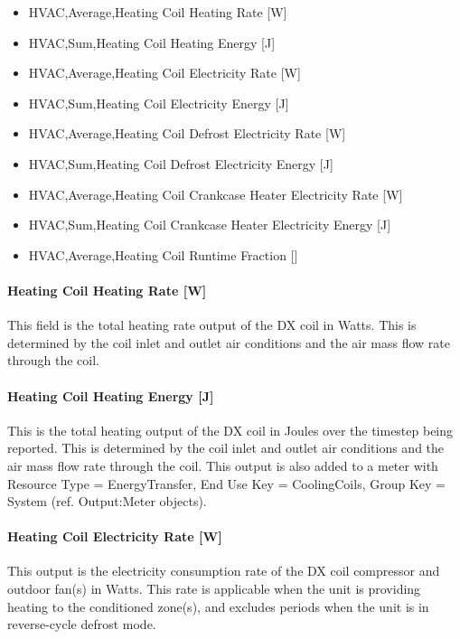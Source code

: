 \begin{itemize}
\item
  HVAC,Average,Heating Coil Heating Rate {[}W{]}
\item
  HVAC,Sum,Heating Coil Heating Energy {[}J{]}
\item
  HVAC,Average,Heating Coil Electricity Rate {[}W{]}
\item
  HVAC,Sum,Heating Coil Electricity Energy {[}J{]}
\item
  HVAC,Average,Heating Coil Defrost Electricity Rate {[}W{]}
\item
  HVAC,Sum,Heating Coil Defrost Electricity Energy {[}J{]}
\item
  HVAC,Average,Heating Coil Crankcase Heater Electricity Rate {[}W{]}
\item
  HVAC,Sum,Heating Coil Crankcase Heater Electricity Energy {[}J{]}
\item
  HVAC,Average,Heating Coil Runtime Fraction {[]}
\end{itemize}

\paragraph{Heating Coil Heating Rate {[}W{]}}\label{heating-coil-heating-rate-w-7}

This field is the total heating rate output of the DX coil in Watts. This is determined by the coil inlet and outlet air conditions and the air mass flow rate through the coil.

\paragraph{Heating Coil Heating Energy {[}J{]}}\label{heating-coil-heating-energy-j-7}

This is the total heating output of the DX coil in Joules over the timestep being reported. This is determined by the coil inlet and outlet air conditions and the air mass flow rate through the coil. This output is also added to a meter with Resource Type = EnergyTransfer, End Use Key = CoolingCoils, Group Key = System (ref. Output:Meter objects).

\paragraph{Heating Coil Electricity Rate {[}W{]}}\label{heating-coil-electric-power-w-5}

This output is the electricity consumption rate of the DX coil compressor and outdoor fan(s) in Watts. This rate is applicable when the unit is providing heating to the conditioned zone(s), and excludes periods when the unit is in reverse-cycle defrost mode.

